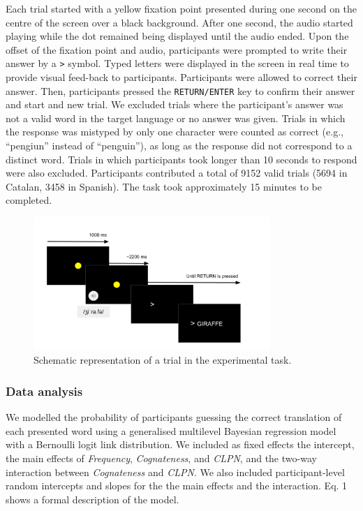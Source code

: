 \documentclass[
]{article}
\begin{document}
Each trial started with a yellow fixation point presented during one
second on the centre of the screen over a black background. After one
second, the audio started playing while the dot remained being displayed
until the audio ended. Upon the offset of the fixation point and audio,
participants were prompted to write their answer by a
\texttt{\textgreater{}} symbol. Typed letters were displayed in the
screen in real time to provide visual feed-back to participants.
Participants were allowed to correct their answer. Then, participants
pressed the \texttt{RETURN/ENTER} key to confirm their answer and start
and new trial. We excluded trials where the participant's answer was not
a valid word in the target language or no answer was given. Trials in
which the response was mistyped by only one character were counted as
correct (e.g., ``pengiun'' instead of ``penguin''), as long as the
response did not correspond to a distinct word. Trials in which
participants took longer than 10 seconds to respond were also excluded.
Participants contributed a total of 9152 valid trials (5694 in Catalan,
3458 in Spanish). The task took approximately 15 minutes to be
completed.

\begin{figure}[H]

{\centering \includegraphics[width=0.8\textwidth,height=\textheight]{../img/design.png}

}

\caption{Schematic representation of a trial in the experimental task.}

\end{figure}%

\subsubsection{Data analysis}\label{data-analysis}

We modelled the probability of participants guessing the correct
translation of each presented word using a generalised multilevel
Bayesian regression model with a Bernoulli logit link distribution. We
included as fixed effects the intercept, the main effects of
\emph{Frequency}, \emph{Cognateness}, and \emph{CLPN}, and the two-way
interaction between \emph{Cognateness} and \emph{CLPN}. We also included
participant-level random intercepts and slopes for the the main effects
and the interaction. Eq. 1 shows a formal description of the model.
\end{document}
